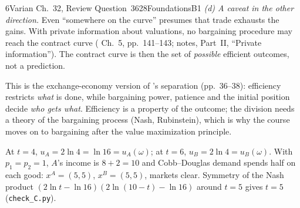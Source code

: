 \begin{exsol}{6}{Varian Ch.~32, Review Question~3}{628}{Foundations}{B1}
\emph{(d) A caveat in the other direction.} Even ``somewhere on the curve'' presumes that trade
exhausts the gains. With private information about valuations, no bargaining procedure may reach
the contract curve (\MR{} Ch.~5, pp.~141--143; notes, Part~II, ``Private information''). The contract curve is
then the set of \emph{possible} efficient outcomes, not a prediction.

\interp This is the exchange-economy version of \MR's separation (pp.~36--38): efficiency
restricts \emph{what} is done, while bargaining power, patience and the initial position decide
\emph{who gets what}. Efficiency is a property of the outcome; the division needs a theory of the
bargaining process (Nash, Rubinstein), which is why the course moves on to bargaining after the
value maximization principle.

\verify At $t=4$, $u_A = 2\ln 4 = \ln 16 = u_A(\omega)$; at $t=6$, $u_B = 2\ln 4 = u_B(\omega)$.
With $p_1 = p_2 = 1$, $A$'s income is $8+2 = 10$ and Cobb--Douglas demand spends half on each good:
$x^A = (5,5)$, $x^B = (5,5)$, markets clear. Symmetry of the Nash product
$(2\ln t - \ln 16)(2\ln(10-t) - \ln 16)$ around $t=5$ gives $t=5$ (\texttt{check\_C.py}).

\end{exsol}
